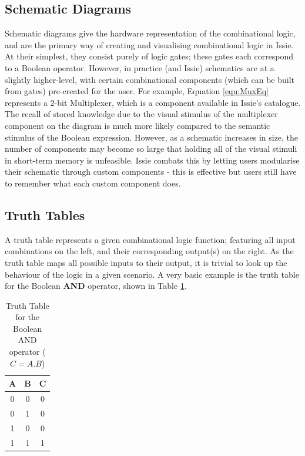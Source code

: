 \subsection{Schematic Diagrams}
Schematic diagrams give the hardware representation of the combinational logic, and are the primary way of creating and visualising combinational logic in Issie. At their simplest, they consist purely of logic gates; these gates each correspond to a Boolean operator. However, in practice (and Issie) schematics are at a slightly higher-level, with certain combinational components (which can be built from gates) pre-created for the user. For example, Equation \ref{equ:MuxEq} represents a 2-bit Multiplexer, which is a component available in Issie's catalogue. The recall of stored knowledge due to the visual stimulus of the multiplexer component on the diagram is much more likely compared to the semantic stimulus of the Boolean expression. However, as a schematic increases in size, the number of components may become so large that holding all of the visual stimuli in short-term memory is unfeasible. Issie combats this by letting users modularise their schematic through custom components - this is effective but users still have to remember what each custom component does.

\subsection{Truth Tables} \label{subsec:TruthTables}
A truth table represents a given combinational logic function; featuring all input combinations on the left, and their corresponding output(s) on the right. As the truth table maps all possible inputs to their output, it is trivial to look up the behaviour of the logic in a given scenario. A very basic example is the truth table for the Boolean \textbf{AND} operator, shown in Table \ref{tab:And_TT}.

\begin{table}[h!]
    \centering
    \begin{tabular}{c|c||c}
     \textbf{A} & \textbf{B} & \textbf{C} \\
     \hline
     0 & 0 & 0  \\
     0 & 1 & 0  \\
     1 & 0 & 0  \\
     1 & 1 & 1
    \end{tabular}
    \caption{Truth Table for the Boolean AND operator ($C = A.B$)}
    \label{tab:And_TT}
\end{table}

